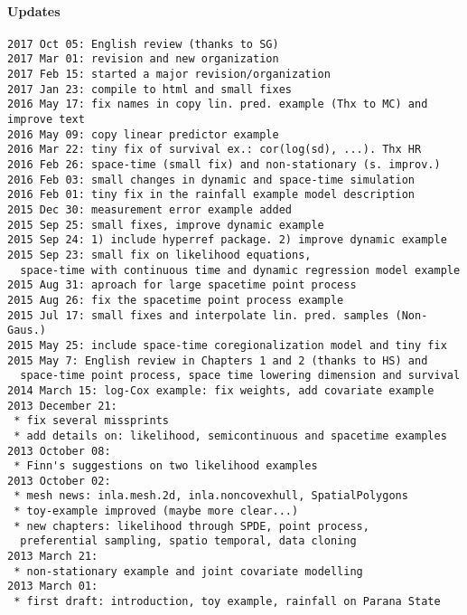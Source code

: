 \paragraph{Updates}

\begin{verbatim}
2017 Oct 05: English review (thanks to SG)
2017 Mar 01: revision and new organization
2017 Feb 15: started a major revision/organization
2017 Jan 23: compile to html and small fixes
2016 May 17: fix names in copy lin. pred. example (Thx to MC) and improve text
2016 May 09: copy linear predictor example
2016 Mar 22: tiny fix of survival ex.: cor(log(sd), ...). Thx HR
2016 Feb 26: space-time (small fix) and non-stationary (s. improv.)
2016 Feb 03: small changes in dynamic and space-time simulation
2016 Feb 01: tiny fix in the rainfall example model description
2015 Dec 30: measurement error example added 
2015 Sep 25: small fixes, improve dynamic example
2015 Sep 24: 1) include hyperref package. 2) improve dynamic example
2015 Sep 23: small fix on likelihood equations, 
  space-time with continuous time and dynamic regression model example
2015 Aug 31: aproach for large spacetime point process 
2015 Aug 26: fix the spacetime point process example  
2015 Jul 17: small fixes and interpolate lin. pred. samples (Non-Gaus.)
2015 May 25: include space-time coregionalization model and tiny fix
2015 May 7: English review in Chapters 1 and 2 (thanks to HS) and 
  space-time point process, space time lowering dimension and survival
2014 March 15: log-Cox example: fix weights, add covariate example
2013 December 21: 
 * fix several missprints
 * add details on: likelihood, semicontinuous and spacetime examples 
2013 October 08: 
 * Finn's suggestions on two likelihood examples 
2013 October 02:
 * mesh news: inla.mesh.2d, inla.noncovexhull, SpatialPolygons 
 * toy-example improved (maybe more clear...) 
 * new chapters: likelihood through SPDE, point process, 
  preferential sampling, spatio temporal, data cloning
2013 March 21:
 * non-stationary example and joint covariate modelling
2013 March 01: 
 * first draft: introduction, toy example, rainfall on Parana State
\end{verbatim}
